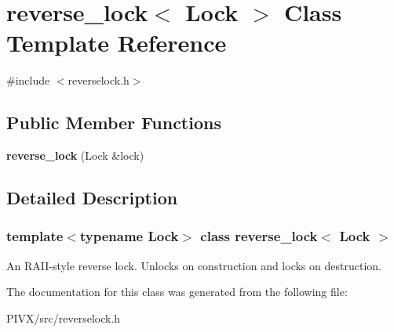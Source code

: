 \hypertarget{classreverse__lock}{}\section{reverse\+\_\+lock$<$ Lock $>$ Class Template Reference}
\label{classreverse__lock}


{\ttfamily \#include $<$reverselock.\+h$>$}

\subsection*{Public Member Functions}
\begin{DoxyCompactItemize}
\item 
\mbox{\label{classreverse__lock_ad0eb788e8f41452d24dbf32cdf0e6c16}} 
{\bfseries reverse\+\_\+lock} (Lock \&lock)
\end{DoxyCompactItemize}


\subsection{Detailed Description}
\subsubsection*{template$<$typename Lock$>$\newline
class reverse\+\_\+lock$<$ Lock $>$}

An R\+A\+I\+I-\/style reverse lock. Unlocks on construction and locks on destruction. 

The documentation for this class was generated from the following file\+:\begin{DoxyCompactItemize}
\item 
P\+I\+V\+X/src/reverselock.\+h\end{DoxyCompactItemize}
